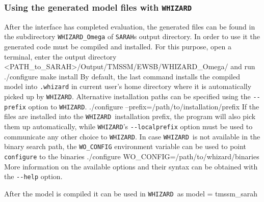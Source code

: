 \documentclass[12pt]{book}
\newenvironment{code}%
  {\begingroup\footnotesize
   \quote
   \Verbatim}%
  {\endVerbatim
   \endquote
   \endgroup\noindent}
\newcommand{\ttt}[1]{\texttt{#1}}
\newcommand{\whizard}{\ttt{WHIZARD}}
\newcommand{\sarah}{\ttt{SARAH}}
\begin{document}
\subsubsection{Using the generated model files with \whizard}

After the interface has completed evaluation, the generated files can
be found in the subdirectory \verb"WHIZARD_Omega" of {\sarah}s output
directory. In order to use it the generated code must be compiled and
installed. For this purpose, open a terminal, enter the output directory
\begin{code}
<PATH_to_SARAH>/Output/TMSSM/EWSB/WHIZARD_Omega/
\end{code}
and run
%
\begin{code}
./configure
make install
\end{code}
%
By default, the last command installs the compiled model into \verb".whizard"
in current user's home directory where it is automatically picked up by
\whizard. Alternative installation paths can be specified using the
\verb"--prefix" option to \whizard.
%
\begin{code}
./configure --prefix=/path/to/installation/prefix
\end{code}
%
If the files are installed into the \whizard\
installation prefix, the program will also pick them up automatically, while
{\whizard}'s \verb"--localprefix" option must be used to communicate any other
choice to \whizard. In case \whizard\ is not available in the binary search
path, the \verb"WO_CONFIG" environment variable can be used to point
\verb"configure" to the binaries
%
\begin{code}
./configure WO_CONFIG=/path/to/whizard/binaries
\end{code}
%
More information on the available options and their syntax can be obtained with
the
\verb"--help" option.

After the model is compiled it can be used in \whizard\ as
\begin{code}
model = tmssm_sarah
\end{code}
\end{document}
